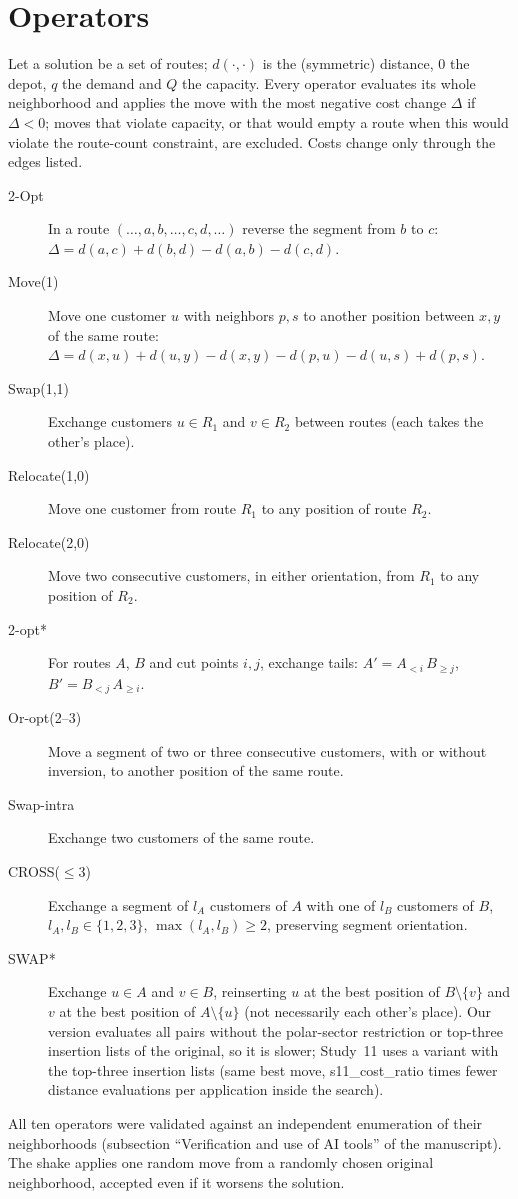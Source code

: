 \section{Operators}\label{app:operators}
Let a solution be a set of routes; $d(\cdot,\cdot)$ is the (symmetric) distance, $0$ the depot, $q$ the demand and $Q$ the capacity. Every operator evaluates its whole neighborhood and applies the move with the most negative cost change $\Delta$ if $\Delta<0$; moves that violate capacity, or that would empty a route when this would violate the route-count constraint, are excluded. Costs change only through the edges listed.
\begin{description}
\item[2-Opt] In a route $(\dots,a,b,\dots,c,d,\dots)$ reverse the segment from $b$ to $c$: $\Delta=d(a,c)+d(b,d)-d(a,b)-d(c,d)$.
\item[Move(1)] Move one customer $u$ with neighbors $p,s$ to another position between $x,y$ of the same route: $\Delta=d(x,u)+d(u,y)-d(x,y)-d(p,u)-d(u,s)+d(p,s)$.
\item[Swap(1,1)] Exchange customers $u\in R_1$ and $v\in R_2$ between routes (each takes the other's place).
\item[Relocate(1,0)] Move one customer from route $R_1$ to any position of route $R_2$.
\item[Relocate(2,0)] Move two consecutive customers, in either orientation, from $R_1$ to any position of $R_2$.
\item[2-opt*] For routes $A$, $B$ and cut points $i,j$, exchange tails: $A'=A_{<i}\,B_{\ge j}$, $B'=B_{<j}\,A_{\ge i}$.
\item[Or-opt(2--3)] Move a segment of two or three consecutive customers, with or without inversion, to another position of the same route.
\item[Swap-intra] Exchange two customers of the same route.
\item[CROSS($\le3$)] Exchange a segment of $l_A$ customers of $A$ with one of $l_B$ customers of $B$, $l_A,l_B\in\{1,2,3\}$, $\max(l_A,l_B)\ge2$, preserving segment orientation.
\item[SWAP*] \citep{vidal2022} Exchange $u\in A$ and $v\in B$, reinserting $u$ at the best position of $B\setminus\{v\}$ and $v$ at the best position of $A\setminus\{u\}$ (not necessarily each other's place). Our version evaluates all pairs without the polar-sector restriction or top-three insertion lists of the original, so it is slower; Study~11 uses a variant with the top-three insertion lists (same best move, \num{s11_cost_ratio} times fewer distance evaluations per application inside the search).
\end{description}
All ten operators were validated against an independent enumeration of their neighborhoods (subsection ``Verification and use of AI tools'' of the manuscript). The shake applies one random move from a randomly chosen original neighborhood, accepted even if it worsens the solution.

